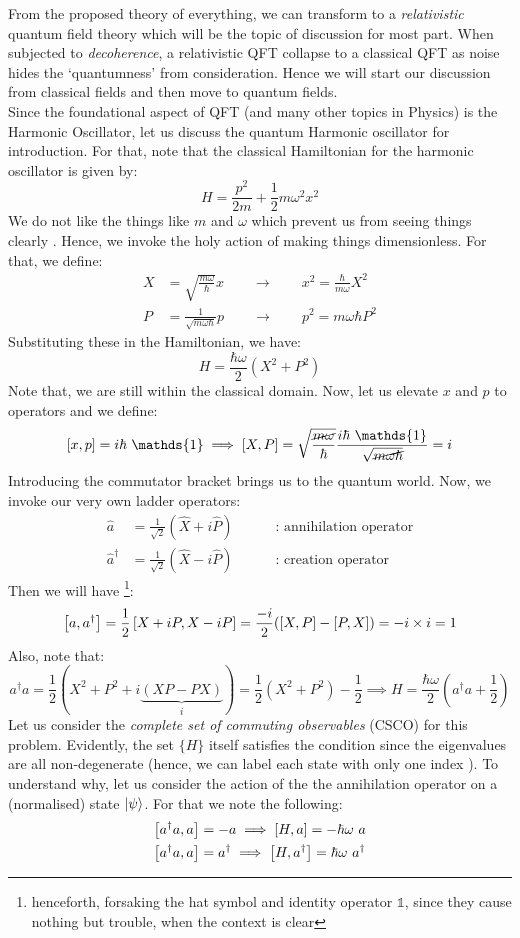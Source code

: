 \noindent
From the proposed theory of everything, we can transform to a \textit{relativistic } quantum field theory which will be the topic of discussion for most part. When subjected to \textit{decoherence}, a relativistic QFT collapse to a classical QFT as noise hides the `quantumness' from consideration. Hence we will start our discussion from classical fields and then move to quantum fields.\\[0.2cm]
Since the foundational aspect of QFT (and many other topics in Physics) is the Harmonic Oscillator, let us discuss the quantum Harmonic oscillator for introduction. For that, note that the classical Hamiltonian for the harmonic oscillator is given by:
$$H = \frac{p^2}{2m}+\frac{1}{2}m\omega^2x^2 $$
We do not like the things like $m$ and $\omega$ which prevent us from seeing things clearly . Hence, we invoke the holy action of making things dimensionless. For that, we define:
\begin{align*}
    X &= \sqrt{\frac{m\omega}{\hbar}}x \qquad \longrightarrow\qquad x^2 = \frac{\hbar}{m\omega}X^2  \\
    P &=\frac{1}{\sqrt{m\omega\hbar}}p \qquad \longrightarrow\qquad p^2 = m\omega \hbar P^2
\end{align*}
Substituting these in the Hamiltonian, we have: 
$$H = \frac{\hbar\omega}{2}(X^2+P^2)$$
Note that, we are still within the classical domain. Now, let us elevate $x$ and $p$ to operators and we define:
$$\comtr{x}{p}=i\hbar\ \mathds{1} \implies \comtr{X}{P} =\sqrt{ \frac{\cancel{m\omega}}{{\hbar}}}\frac{i\hbar \ \mathds{1}}{\sqrt{\cancel{m\omega\hbar}}} = i$$
Introducing the commutator bracket brings us to the quantum world. Now, we invoke our very own ladder operators:
\begin{align*}
    \hat{a} &= \frac{1}{\sqrt{2}}(\hat{X}+ i\hat{P})\qquad \quad \text{: annihilation operator}\\
    \hat{a}^{\dagger} &= \frac{1}{\sqrt{2}}(\hat{X}- i\hat{P})\qquad \quad \text{: creation operator}
\end{align*}
Then we will have \footnote{henceforth, forsaking the hat symbol and identity operator $\mathds{1}$, since they cause nothing but trouble, when the context is clear}:
$$\left[ a, a^\dagger \right] = \frac{1}{2}\left[ X +iP, X-iP \right] = \frac{-i}{2}\qty(\left[ X, P \right]-\left[ P, X \right]) = -i\times i = 1$$
Also, note that:
$$a^\dagger a = \frac{1}{2}(X^2+P^2+i\underbrace{(XP-PX)}_{i})= \frac{1}{2}(X^2+P^2)-\frac{1}{2}\implies H = \frac{\hbar\omega}{2}(a^\dagger a +\frac{1}{2})$$
Let us consider the \textit{complete set of commuting observables} (CSCO) for this problem. Evidently, the set $\{H\}$ itself satisfies the condition since the eigenvalues are all non-degenerate (hence, we can label each state with only one index ). To understand why, let us consider the action of the the annihilation operator on a (normalised) state $\ket{\psi}$. For that we note the following:
\begin{align*}
    \left[ a^\dagger a, a \right] &= -a \implies \left[ H, a \right] = -\hbar\omega \ a\\
\left[ a^\dagger a, a \right] &= a^\dagger \implies \left[ H, a^\dagger \right] = \hbar\omega \ a^\dagger
\end{align*}

